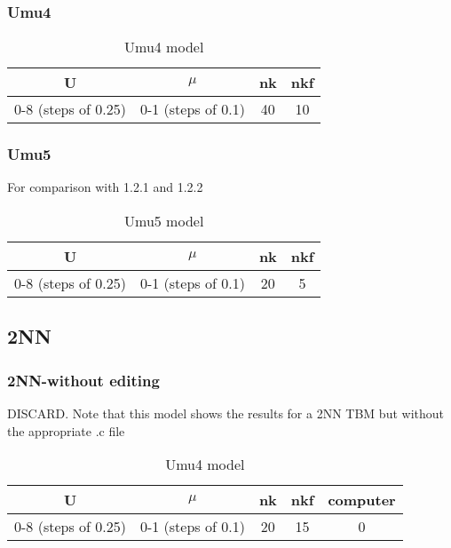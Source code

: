 \documentclass{article}
\begin{document}
\subsubsection{Umu4}

\begin{table}[h]
    \centering
    \begin{tabular}{|c|c|c|c|}
        \hline
        U & $\mu$ &  nk & nkf\\ \hline
        0-8 (steps of 0.25)  &  0-1 (steps of 0.1)  & 40   & 10   \\ \hline
    \end{tabular}
    \caption{Umu4 model}
    \label{tab:example_table}
\end{table}

\subsubsection{Umu5}

For comparison with 1.2.1 and 1.2.2

\begin{table}[h]
    \centering
    \begin{tabular}{|c|c|c|c|}
        \hline
        U & $\mu$ &  nk & nkf\\ \hline
        0-8 (steps of 0.25)  &  0-1 (steps of 0.1)  & 20   & 5   \\ \hline
    \end{tabular}
    \caption{Umu5 model}
    \label{tab:example_table}
\end{table}


\subsection{2NN}

\subsubsection{2NN-without editing}

DISCARD. Note that this model shows the results for a 2NN TBM but without the appropriate .c file

\begin{table}[h]
    \centering
    \begin{tabular}{|c|c|c|c|c|}
        \hline
        U & $\mu$ &  nk & nkf & computer \\ \hline
        0-8 (steps of 0.25)  &  0-1 (steps of 0.1)  & 20   & 15 & 0  \\ \hline
    \end{tabular}
    \caption{Umu4 model}
    \label{tab:example_table}
\end{table}
\end{document}
